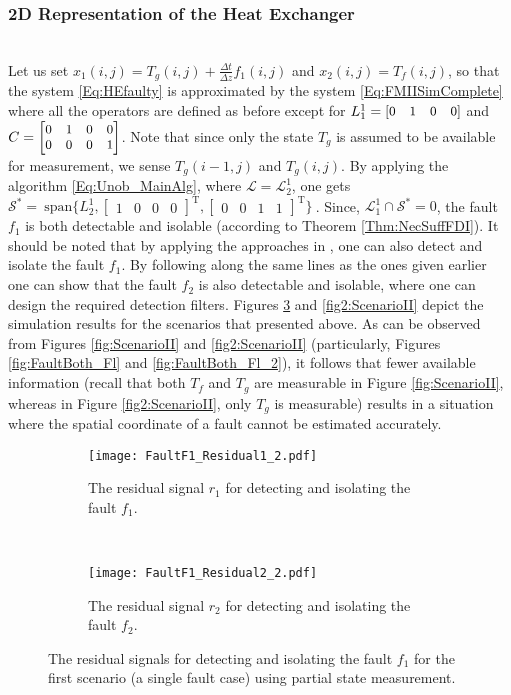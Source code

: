 \documentclass[journal,12pt,draftcls,onecolumn]{IEEEtran}
\newcommand{\tran}{\mathrm{T}}
\newcommand{\bbm}{\begin{bmatrix}}
\newcommand{\ebm}{\end{bmatrix}}
\newcommand{\bs}{\begin{small}}
\newcommand{\es}{\end{small}}
\newcommand{\ssp}[1]{\mathscr{#1}}      \newcommand{\setssp}[1]{\mathfrak{#1}}   \newcommand{\fld}[1]{\mathbb{#1}}       \newcommand{\op}[1]{\mathcal{#1}}       \newcommand{\sumbanach}[1]{\sum{#1}}
\newcommand{\spanset}[1]{\ \mathrm{span}\{#1\}\ } \newcommand{\idv}{{\bf x}_{-\infty}^\infty}				\newcommand{\fdv}{{\bf x}}
\begin{document}
\subsubsection{2D Representation of the Heat Exchanger}\ \\
Let us set $x_1(i,j) = T_g(i,j)+\frac{\Delta t}{\Delta z}f_1(i,j)$ and $x_2(i,j) = T_f(i,j)$, so that the system \eqref{Eq:HEfaulty} is approximated by the system \eqref{Eq:FMIISimComplete} where all the operators are defined as before except for $\bs L_1^1 = \bbm 0 &1 &0 &0\ebm\es$ and $\bs C= \bbm 0 &1 &0 &0\\0 &0 &0 &1\ebm\es$. Note that since only the state $T_g$ is assumed to be available for measurement, we sense $T_g(i-1,j)$ and $T_g(i,j)$. By applying the algorithm \eqref{Eq:Unob_MainAlg}, where $\ssp{L}=\ssp{L}_2^1$, one gets $\op{S}^{*} = \spanset{L_2^1,\bbm 1 &0 &0 &0\ebm^\tran,\bbm 0 &0 &1 &1\ebm^\tran}$. Since, $\ssp{L}_1^1\cap\op{S}^* = 0$, the fault $f_1$ is both detectable and isolable (according to  Theorem \ref{Thm:NecSuffFDI}). It should be noted that  by applying the approaches in \cite{BisiaccoMultiDim,BisiaccoLetter,Malek_3DFDI}, one can also detect and isolate the fault $f_1$. By following along the same lines as the ones given earlier one can show that the fault $f_2$ is also detectable and isolable, where one can  design the required detection filters. Figures \ref{fig2:ScenarioI} and \ref{fig2:ScenarioII} depict the simulation results for the scenarios that presented above. As can be observed from Figures \ref{fig:ScenarioII} and \ref{fig2:ScenarioII} (particularly, Figures \ref{fig:FaultBoth_Fl} and \ref{fig:FaultBoth_Fl_2}), it follows that fewer available information (recall that both $T_f$ and $T_g$ are measurable in Figure \ref{fig:ScenarioII}, whereas in Figure \ref{fig2:ScenarioII}, only $T_g$ is measurable) results in a situation where the spatial coordinate of a fault cannot be estimated accurately.  
\begin{figure}
	\centering
	\begin{subfigure}{0.4\textwidth}
		\texttt{[image: FaultF1\_Residual1\_2.pdf]}
		\caption{The residual signal $r_1$ for detecting and isolating the fault $f_1$.}
		\label{fig:FaultFl_Ff_2}
	\end{subfigure}
	~
	\begin{subfigure}{0.4\textwidth}
\texttt{[image: FaultF1\_Residual2\_2.pdf]}
		\caption{The residual signal $r_2$ for detecting and isolating the fault $f_2$.}
		\label{fig:FaultFl_Fl_2}
	\end{subfigure}
	\caption{The residual signals for detecting and isolating the fault $f_1$ for the first scenario (a single fault case) using partial state measurement.}
	\label{fig2:ScenarioI}
	\vspace{-2mm}
\end{figure}
\end{document}
